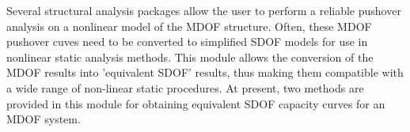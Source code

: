 
Several structural analysis packages allow the user to perform a reliable pushover analysis on a nonlinear model of the MDOF structure. Often, these MDOF pushover cuves need to be converted to simplified SDOF models for use in nonlinear static analysis methods. This module allows the conversion of the MDOF results into 'equivalent SDOF' results, thus making them compatible with a wide range of non-linear static procedures. At present, two methods are provided in this module for obtaining equivalent SDOF capacity curves for an MDOF system.

